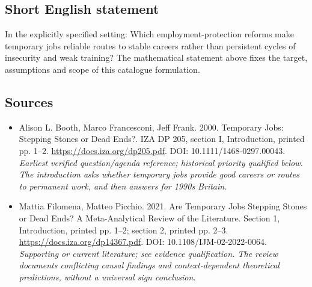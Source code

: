 \documentclass[11pt]{article}
\begin{document}
\subsection{Short English statement}
In the explicitly specified setting: Which employment-protection reforms make temporary jobs reliable routes to stable careers rather than persistent cycles of insecurity and weak training? The mathematical statement above fixes the target, assumptions and scope of this catalogue formulation.

\subsection{Sources}
\begin{itemize}\raggedright
\item[\textnormal{[S1]}]\hypertarget{source:30007641:1}{} Alison L. Booth, Marco Francesconi, Jeff Frank. 2000. Temporary Jobs: Stepping Stones or Dead Ends?. IZA DP 205, section I, Introduction, printed pp. 1–2.
\url{https://docs.iza.org/dp205.pdf}.
DOI: 10.1111/1468-0297.00043.
{\small\textit{Earliest verified question/agenda reference; historical priority qualified below. The introduction asks whether temporary jobs provide good careers or routes to permanent work, and then answers for 1990s Britain.}}

\item[\textnormal{[S2]}]\hypertarget{source:30007641:2}{} Mattia Filomena, Matteo Picchio. 2021. Are Temporary Jobs Stepping Stones or Dead Ends? A Meta-Analytical Review of the Literature. Section 1, Introduction, printed pp. 1–2; section 2, printed pp. 2–3.
\url{https://docs.iza.org/dp14367.pdf}.
DOI: 10.1108/IJM-02-2022-0064.
{\small\textit{Supporting or current literature; see evidence qualification. The review documents conflicting causal findings and context-dependent theoretical predictions, without a universal sign conclusion.}}
\end{itemize}
\end{document}
